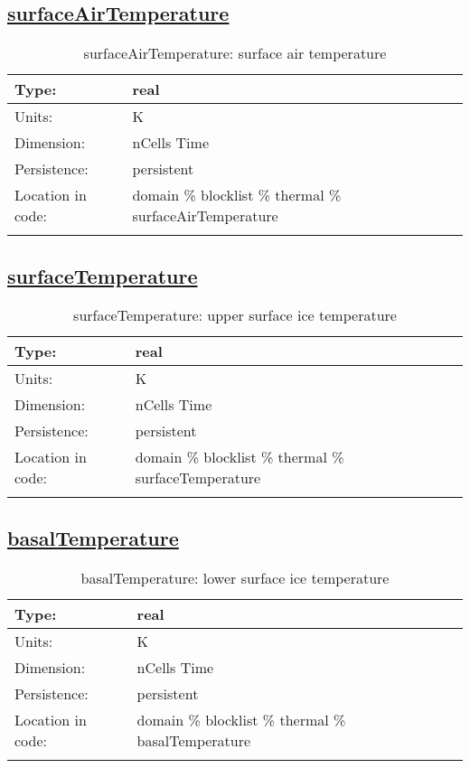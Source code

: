 \subsection[surfaceAirTemperature]{\hyperref[sec:var_tab_thermal]{surfaceAirTemperature}}
\label{subsec:var_sec_thermal_surfaceAirTemperature}
\begin{center}
\begin{longtable}{| p{2.0in} | p{4.0in} |}
        \hline 
        Type: & real \\
        \hline 
        Units: & \si{K} \\
        \hline 
        Dimension: & nCells Time \\
        \hline 
        Persistence: & persistent \\
        \hline 
         Location in code: & domain \% blocklist \% thermal \% surfaceAirTemperature \\
         \hline 
    \caption{surfaceAirTemperature: surface air temperature}
\end{longtable}
\end{center}
\subsection[surfaceTemperature]{\hyperref[sec:var_tab_thermal]{surfaceTemperature}}
\label{subsec:var_sec_thermal_surfaceTemperature}
\begin{center}
\begin{longtable}{| p{2.0in} | p{4.0in} |}
        \hline 
        Type: & real \\
        \hline 
        Units: & \si{K} \\
        \hline 
        Dimension: & nCells Time \\
        \hline 
        Persistence: & persistent \\
        \hline 
         Location in code: & domain \% blocklist \% thermal \% surfaceTemperature \\
         \hline 
    \caption{surfaceTemperature: upper surface ice temperature}
\end{longtable}
\end{center}
\subsection[basalTemperature]{\hyperref[sec:var_tab_thermal]{basalTemperature}}
\label{subsec:var_sec_thermal_basalTemperature}
\begin{center}
\begin{longtable}{| p{2.0in} | p{4.0in} |}
        \hline 
        Type: & real \\
        \hline 
        Units: & \si{K} \\
        \hline 
        Dimension: & nCells Time \\
        \hline 
        Persistence: & persistent \\
        \hline 
         Location in code: & domain \% blocklist \% thermal \% basalTemperature \\
         \hline 
    \caption{basalTemperature: lower surface ice temperature}
\end{longtable}
\end{center}
